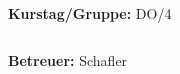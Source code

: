\documentclass[12pt,a4paper]{article}
\begin{document}
\begin{verbatim}


\end{verbatim}
			\begin{flushleft}
			\textbf{\Large{Kurstag/Gruppe:}} \Large{DO/4}
			\end{flushleft}

\begin{verbatim}

\end{verbatim}
			\begin{flushleft}
			\LARGE{\textbf{Betreuer:}}	\Large{Schafler}	
			\end{flushleft}

\pagebreak
\setlength{\columnsep}{20pt}
\end{document}
